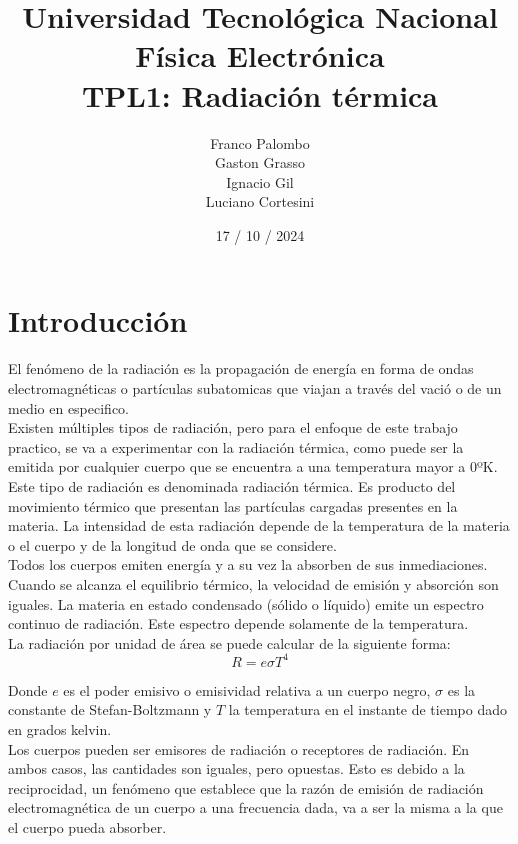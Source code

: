 \documentclass[a4paper,12pt]{report}
\title{%
  \fontsize{25}{0}\selectfont Universidad Tecnológica Nacional \\
  \fontsize{22}{30}\selectfont Física Electrónica \\
  \fontsize{18}{25}\selectfont TPL1: Radiación térmica
}
\author{
Franco Palombo\\
Gaston Grasso\\
Ignacio Gil\\
Luciano Cortesini\\
}
\date{17 / 10 / 2024}
\begin{document}
\maketitle

\chapter{Introducción}
  El fenómeno de la radiación es la propagación de energía en forma de ondas electromagnéticas o partículas subatomicas
  que viajan a través del vació o de un medio en especifico.\\

  Existen múltiples tipos de radiación, pero para el enfoque de este trabajo practico, se va a experimentar con la
  radiación térmica, como puede ser la emitida por cualquier cuerpo que se encuentra a una temperatura mayor a 0ºK.
  Este tipo de radiación es denominada radiación térmica. Es producto del movimiento térmico que presentan las
  partículas cargadas presentes en la materia. La intensidad de esta radiación depende de la temperatura de la materia
  o el cuerpo y de la longitud de onda que se considere.\\

  Todos los cuerpos emiten energía y a su vez la absorben de sus inmediaciones. Cuando se alcanza el equilibrio térmico,
  la velocidad de emisión y absorción son iguales. La materia en estado condensado (sólido o líquido) emite un espectro
  continuo de radiación. Este espectro depende solamente de la temperatura.\\

  La radiación por unidad de área se puede calcular de la siguiente forma:
  \begin{equation}
    R = e \sigma T^4
  \end{equation}

  Donde $e$ es el poder emisivo o emisividad relativa a un cuerpo negro, $\sigma$ es la constante de Stefan-Boltzmann y
  $T$ la temperatura en el instante de tiempo dado en grados kelvin.\\

  Los cuerpos pueden ser emisores de radiación o receptores de radiación. En ambos casos, las cantidades son iguales,
  pero opuestas. Esto es debido a la reciprocidad, un fenómeno que establece que la razón de emisión de radiación
  electromagnética de un cuerpo a una frecuencia dada, va a ser la misma a la que el cuerpo pueda absorber.\\
\end{document}
